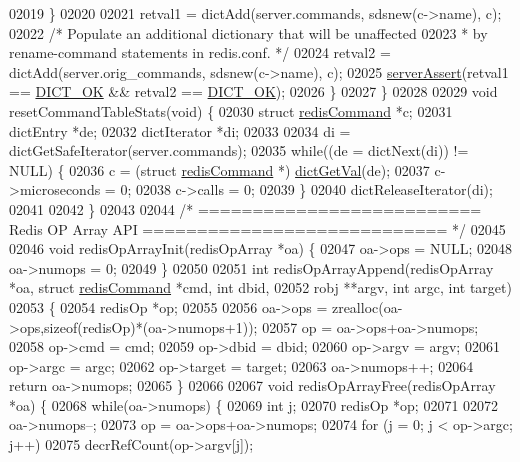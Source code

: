 \begin{DoxyCode}
{{{{{{{{{{{{{{{{{{{{{{{{{{{{{02019         \}
02020 
02021         retval1 = dictAdd(server.commands, sdsnew(c->name), c);
02022         \textcolor{comment}{/* Populate an additional dictionary that will be unaffected}
02023 \textcolor{comment}{         * by rename-command statements in redis.conf. */}
02024         retval2 = dictAdd(server.orig\_commands, sdsnew(c->name), c);
02025         \hyperlink{server_8h_a88114b5169b4c382df6b56506285e56a}{serverAssert}(retval1 == \hyperlink{dict_8h_a2afecbeab8f7efbc183048f52f6d17e5}{DICT\_OK} && retval2 == 
      \hyperlink{dict_8h_a2afecbeab8f7efbc183048f52f6d17e5}{DICT\_OK});
02026     \}
02027 \}
02028 
02029 \textcolor{keywordtype}{void} resetCommandTableStats(\textcolor{keywordtype}{void}) \{
02030     \textcolor{keyword}{struct} \hyperlink{structredisCommand}{redisCommand} *c;
02031     dictEntry *de;
02032     dictIterator *di;
02033 
02034     di = dictGetSafeIterator(server.commands);
02035     \textcolor{keywordflow}{while}((de = dictNext(di)) != NULL) \{
02036         c = (\textcolor{keyword}{struct} \hyperlink{structredisCommand}{redisCommand} *) \hyperlink{dict_8h_ae8d2cc391873b2bea2b87c4f80f43120}{dictGetVal}(de);
02037         c->microseconds = 0;
02038         c->calls = 0;
02039     \}
02040     dictReleaseIterator(di);
02041 
02042 \}
02043 
02044 \textcolor{comment}{/* ========================== Redis OP Array API ============================ */}
02045 
02046 \textcolor{keywordtype}{void} redisOpArrayInit(redisOpArray *oa) \{
02047     oa->ops = NULL;
02048     oa->numops = 0;
02049 \}
02050 
02051 \textcolor{keywordtype}{int} redisOpArrayAppend(redisOpArray *oa, \textcolor{keyword}{struct} \hyperlink{structredisCommand}{redisCommand} *cmd, \textcolor{keywordtype}{int} dbid,
02052                        robj **argv, \textcolor{keywordtype}{int} argc, \textcolor{keywordtype}{int} target)
02053 \{
02054     redisOp *op;
02055 
02056     oa->ops = zrealloc(oa->ops,\textcolor{keyword}{sizeof}(redisOp)*(oa->numops+1));
02057     op = oa->ops+oa->numops;
02058     op->cmd = cmd;
02059     op->dbid = dbid;
02060     op->argv = argv;
02061     op->argc = argc;
02062     op->target = target;
02063     oa->numops++;
02064     \textcolor{keywordflow}{return} oa->numops;
02065 \}
02066 
02067 \textcolor{keywordtype}{void} redisOpArrayFree(redisOpArray *oa) \{
02068     \textcolor{keywordflow}{while}(oa->numops) \{
02069         \textcolor{keywordtype}{int} j;
02070         redisOp *op;
02071 
02072         oa->numops--;
02073         op = oa->ops+oa->numops;
02074         \textcolor{keywordflow}{for} (j = 0; j < op->argc; j++)
02075             decrRefCount(op->argv[j]);
}}}}}}}}}}}}}}}}}}}}}}}}}}}}}
\end{DoxyCode}
